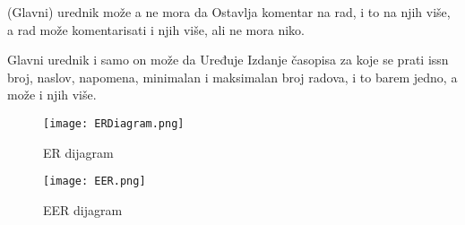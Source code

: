 \documentclass[a4paper]{article}
\begin{document}
(Glavni) urednik može a ne mora da Ostavlja komentar na rad, i to na njih više, a rad može komentarisati i njih više, ali ne mora niko.

Glavni urednik i samo on može da Uređuje Izdanje časopisa za koje se prati issn broj, naslov, napomena, minimalan i maksimalan broj radova, i to barem jedno, a može i njih više.

\begin{figure}[hbt!]
    \centering
    \texttt{[image: ERDiagram.png]}
    \caption{ER dijagram}
    \label{fig:my_label}
\end{figure}

\begin{figure}[hbt!]
    \centering
    \texttt{[image: EER.png]}
    \caption{EER dijagram}
    \label{fig:my_label}
\end{figure}
\end{document}
